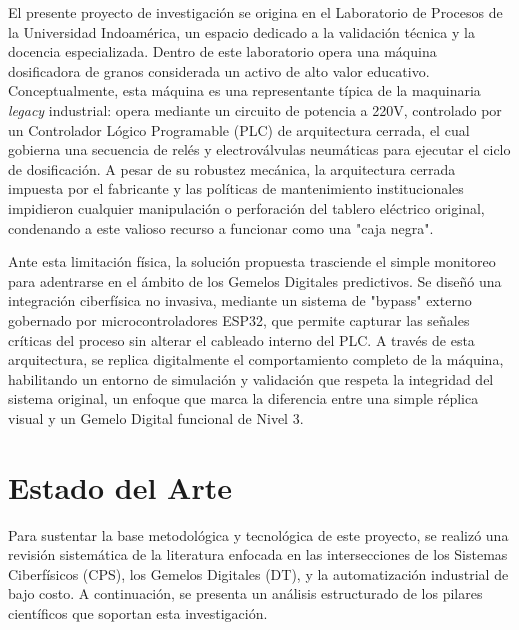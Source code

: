 El presente proyecto de investigación se origina en el Laboratorio de Procesos de la Universidad Indoamérica, un espacio dedicado a la validación técnica y la docencia especializada. Dentro de este laboratorio opera una máquina dosificadora de granos considerada un activo de alto valor educativo. Conceptualmente, esta máquina es una representante típica de la maquinaria \textit{legacy} industrial: opera mediante un circuito de potencia a 220V, controlado por un Controlador Lógico Programable (PLC) de arquitectura cerrada, el cual gobierna una secuencia de relés y electroválvulas neumáticas para ejecutar el ciclo de dosificación. A pesar de su robustez mecánica, la arquitectura cerrada impuesta por el fabricante y las políticas de mantenimiento institucionales impidieron cualquier manipulación o perforación del tablero eléctrico original, condenando a este valioso recurso a funcionar como una "caja negra".

Ante esta limitación física, la solución propuesta trasciende el simple monitoreo para adentrarse en el ámbito de los Gemelos Digitales predictivos. Se diseñó una integración ciberfísica no invasiva, mediante un sistema de "bypass" externo gobernado por microcontroladores ESP32, que permite capturar las señales críticas del proceso sin alterar el cableado interno del PLC. A través de esta arquitectura, se replica digitalmente el comportamiento completo de la máquina, habilitando un entorno de simulación y validación que respeta la integridad del sistema original, un enfoque que marca la diferencia entre una simple réplica visual y un Gemelo Digital funcional de Nivel 3.

\section{Estado del Arte}

Para sustentar la base metodológica y tecnológica de este proyecto, se realizó una revisión sistemática de la literatura enfocada en las intersecciones de los Sistemas Ciberfísicos (CPS), los Gemelos Digitales (DT), y la automatización industrial de bajo costo. A continuación, se presenta un análisis estructurado de los pilares científicos que soportan esta investigación.

